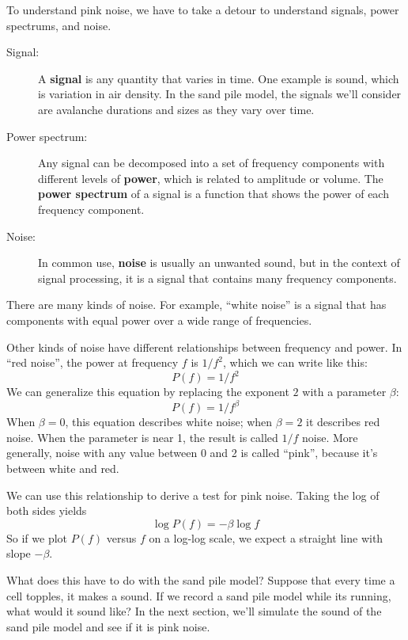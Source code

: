 \documentclass[12pt]{book}
\theoremstyle{exercise}
\begin{document}
To understand pink noise, we have to take a detour to understand
signals, power spectrums, and noise.

\begin{description}

\item[Signal:] A {\bf signal} is any quantity that varies in time.
  One example is sound, which is variation in air density.  In the sand pile model, the signals we'll consider are avalanche durations and sizes as they vary over time.

\item[Power spectrum:] Any signal can be decomposed into a set of frequency components with different levels of {\bf power}, which is related to amplitude or volume.  The {\bf power spectrum} of a signal is a function that shows the power of each frequency component.

\item[Noise:] In common use, {\bf noise} is usually an unwanted sound,
but in the context of signal processing, it is a signal that
contains many frequency components.

\end{description}

There are many kinds of noise.  For example, ``white noise'' is a
signal that has components with equal power over a wide range of
frequencies.


Other kinds of noise have different relationships between frequency
and power.  In ``red noise'', the power at frequency $f$ is
$1/f^2$, which we can write like this:
%
\[ P(f) = 1/f^2 \]
%
We can generalize this equation by replacing the exponent $2$ with
a parameter $\beta$:
%
\[ P(f) = 1/f^\beta \]
%
When $\beta=0$, this equation describes white noise; when $\beta=2$ it
describes red noise.  When the parameter is near 1, the result is called
$1/f$ noise.  More generally, noise with any value between 0 and 2
is called ``pink'', because it's between white and red.


We can use this relationship to derive a test for pink noise.
Taking the log of both sides yields
%
\[ \log P(f) = -\beta \log f \]
%
So if we plot $P(f)$ versus $f$ on a log-log scale, we
expect a straight line with slope $-\beta$.

What does this have to do with the sand pile model?  Suppose that every time
a cell topples, it makes a sound.  If we record a sand pile model
while its running, what would it sound like?  In the next section, we'll simulate the sound of the sand pile model and see if it is pink noise.
\end{document}
